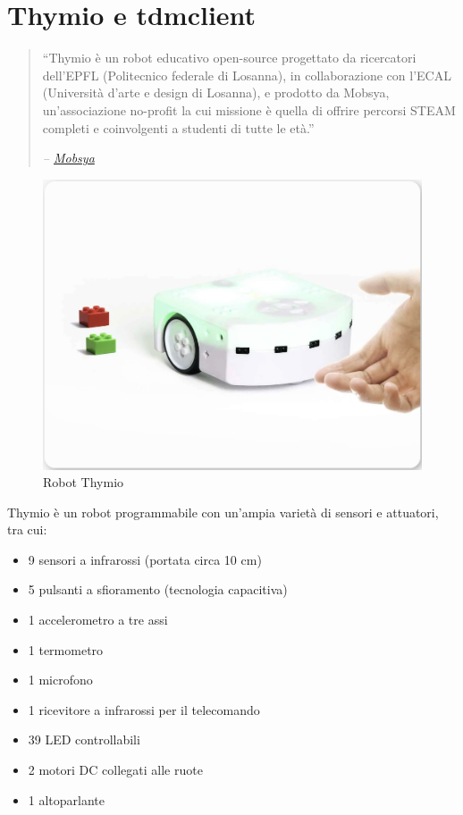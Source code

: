 \documentclass[12pt,a4paper,openright,twoside]{book}
\begin{document}
\section{Thymio e tdmclient}

\begin{quote}
    \raggedright
    ``Thymio è un robot educativo open-source progettato da ricercatori dell'EPFL (Politecnico federale di Losanna), in collaborazione con l'ECAL (Università d'arte e design di Losanna), e prodotto da Mobsya, un'associazione no-profit la cui missione è quella di offrire percorsi STEAM completi e coinvolgenti a studenti di tutte le età.''
    \begin{flushright}
        \textit{-- \href{https://www.thymio.org/}{Mobsya}}
    \end{flushright}
\end{quote}

\begin{figure}
    \centering
    \includegraphics[width=.7\linewidth]{figures/thymio.png}
    \caption{Robot Thymio}
    \label{fig:thymio-robot}
\end{figure}

Thymio \cite{mobsyaThymioDevice} è un robot programmabile con un'ampia varietà di sensori e attuatori, tra cui:
\begin{itemize}
    \item 9 sensori a infrarossi (portata circa 10 cm)
    \item 5 pulsanti a sfioramento (tecnologia capacitiva)
    \item 1 accelerometro a tre assi
    \item 1 termometro
    \item 1 microfono
    \item 1 ricevitore a infrarossi per il telecomando
    \item 39 LED controllabili
    \item 2 motori DC collegati alle ruote
    \item 1 altoparlante
\end{itemize}
\end{document}
